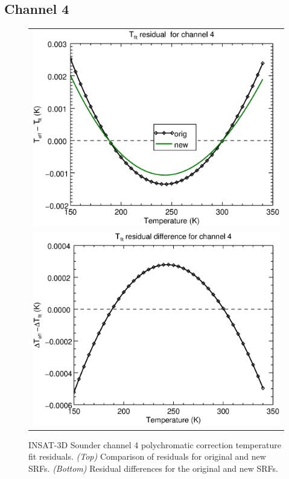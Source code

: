 \subsection{Channel 4}
\begin{figure}[H]
  \centering
  \begin{tabular}{c}
    \includegraphics[scale=0.55]{graphics/sndr/tfit/sndr_insat3d-4.tfit.eps} \\
    \includegraphics[scale=0.55]{graphics/sndr/tfit/sndr_insat3d-4.tfit.difference.eps}
  \end{tabular}
  \caption{INSAT-3D Sounder channel 4 polychromatic correction temperature fit residuals. \emph{(Top)} Comparison of residuals for original and new SRFs. \emph{(Bottom)} Residual differences for the original and new SRFs.}
  \label{fig:sndr_ch4_tfit}
\end{figure}

